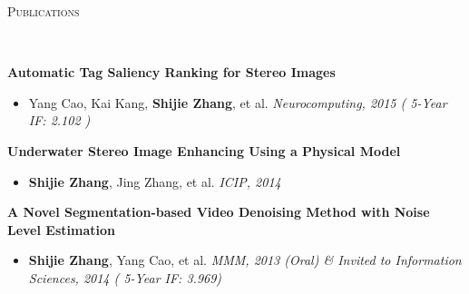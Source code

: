 \documentclass[3pt]{article}
\newenvironment{changemargin}[2]{%
  \begin{list}{}{%
    \setlength{\topsep}{0pt}%
    \setlength{\leftmargin}{#1}%
    \setlength{\rightmargin}{#2}%
    \setlength{\listparindent}{\parindent}%
    \setlength{\itemindent}{\parindent}%
    \setlength{\parsep}{\parskip}%
  }%
  \item[]}{\end{list}
}
\newcommand{\lineover}{
	\begin{changemargin}{-0.05in}{-0.05in}
		\vspace*{-8pt}
		\hrulefill \\
		\vspace*{-2pt}
	\end{changemargin}
}
\newcommand{\header}[1]{
	\begin{changemargin}{-0.5in}{-0.5in}
		{\Large \scshape{#1}}\\
  	\lineover
	\end{changemargin}
}
\newenvironment{body} {
	\vspace*{-16pt}
	\begin{changemargin}{-0.25in}{-0.5in}
  }	
	{\end{changemargin}
}
\begin{document}
\header{Publications}

\begin{body}
	\vspace{18pt}	

	\textbf{ Automatic Tag Saliency Ranking for Stereo Images}
     \begin{itemize} \itemsep -0pt
	\item{Yang Cao, Kai Kang, \textbf{Shijie Zhang}, et al. } \hfill \emph{Neurocomputing, 2015 ( 5-Year IF: 2.102 ) }
           \end{itemize}	

	\textbf{ Underwater Stereo Image Enhancing Using a Physical Model }
     \begin{itemize} \itemsep -0pt
	\item{\textbf{Shijie Zhang}, Jing Zhang, et al. } \hfill \emph{ICIP, 2014 }
           \end{itemize}	

	\textbf{ A Novel Segmentation-based Video Denoising Method with Noise Level Estimation }
     \begin{itemize} \itemsep -0pt
	\item{\textbf{Shijie Zhang}, Yang Cao, et al. } \hfill \emph{MMM, 2013 (Oral) \& Invited to Information Sciences, 2014 ( 5-Year IF: 3.969) }
           \end{itemize}	

\end{body}
\end{document}
